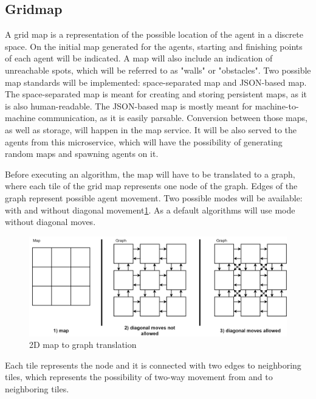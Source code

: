 \subsection{Gridmap}
A grid map is a representation of the possible location of the agent in a discrete space. On the initial map generated for the agents, starting and finishing points of each agent will be indicated. A map will also include an indication of unreachable spots, which will be referred to as "walls" or "obstacles". Two possible map standards will be implemented: space-separated map and JSON-based map. The space-separated map is meant for creating and storing persistent maps, as it is also human-readable. The JSON-based map is mostly meant for machine-to-machine communication, as it is easily parsable. Conversion between those maps, as well as storage, will happen in the map service. It will be also served to the agents from this microservice, which will have the possibility of generating random maps and spawning agents on it.

Before executing an algorithm, the map will have to be translated to a graph, where each tile of the grid map represents one node of the graph. Edges of the graph represent possible agent movement. Two possible modes will be available: with and without diagonal movement\ref{fig:map_2D}. As a default algorithms will use mode without diagonal moves.

\begin{figure}[H]
    \centering
    \includegraphics[width=\textwidth]{pictures/map_2d.png}
    \caption{ 2D map to graph translation }
    \label{fig:map_2D}
\end{figure}

Each tile represents the node and it is connected with two edges to neighboring tiles, which represents the possibility of two-way movement from and to neighboring tiles. 


